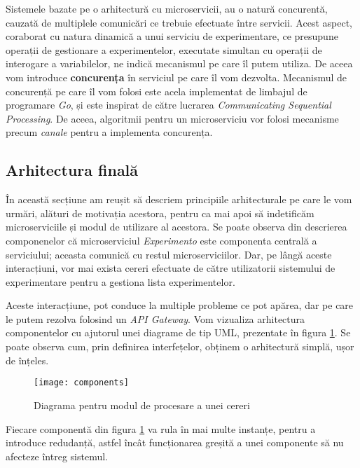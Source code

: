 Sistemele bazate pe o arhitectură cu microservicii, au o natură concurentă, cauzată de multiplele comunicări ce trebuie efectuate între servicii. Acest aspect, coraborat cu natura dinamică a unui serviciu de experimentare, ce presupune operații de gestionare a experimentelor, executate simultan cu operații de interogare a variabilelor, ne indică mecanismul pe care îl putem utiliza. De aceea vom introduce \textbf{concurența} în serviciul pe care îl vom dezvolta. Mecanismul de concurență pe care îl vom folosi este acela implementat de limbajul de programare \textit{Go}, și este inspirat de către lucrarea \textit{Communicating Sequential Processing}\cite{hoare_csp}. De aceea, algoritmii pentru un microserviciu vor folosi mecanisme precum \textit{canale} pentru a implementa concurența.

\subsection{Arhitectura finală}

În această secțiune am reușit să descriem principiile arhitecturale pe care le vom urmări, alături de motivația acestora, pentru ca mai apoi să indetificăm microserviciile și modul de utilizare al acestora. Se poate observa din descrierea componenelor că microserviciul \textit{Experimento} este componenta centrală a serviciului; aceasta comunică cu restul microserviciilor. Dar, pe lângă aceste interacțiuni, vor mai exista cereri efectuate de către utilizatorii sistemului de experimentare pentru a gestiona lista experimentelor. 

Aceste interacțiune, pot conduce la multiple probleme ce pot apărea, dar pe care le putem rezolva folosind un \textit{API Gateway}. Vom vizualiza arhitectura componentelor cu ajutorul unei diagrame de tip UML, prezentate în figura \ref{fig:components}. Se poate observa cum, prin definirea interfețelor, obținem o arhitectură simplă, ușor de înțeles.

\begin{figure}[H]
	\centering
	\texttt{[image: components]}
	\caption{Diagrama pentru modul de procesare a unei cereri}
	\label{fig:components}
\end{figure}

\begin{remark}
	Fiecare componentă din figura \ref{fig:components} va rula în mai multe instanțe, pentru a introduce redudanță, astfel încât funcționarea greșită a unei componente să nu afecteze întreg sistemul.
\end{remark}  

